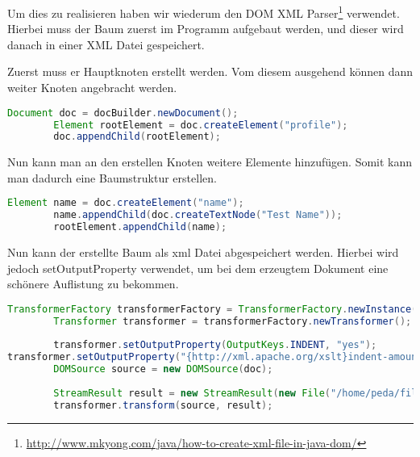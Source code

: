 Um dies zu realisieren haben wir wiederum den DOM XML Parser\footnote{\url{http://www.mkyong.com/java/how-to-create-xml-file-in-java-dom/}} verwendet. Hierbei muss der Baum zuerst im Programm aufgebaut werden, und dieser wird danach in einer XML Datei gespeichert.

Zuerst muss er Hauptknoten erstellt werden. Vom diesem ausgehend können dann weiter Knoten angebracht werden.
\begin{lstlisting}[language=JAVA]
		Document doc = docBuilder.newDocument();
		Element rootElement = doc.createElement("profile");
		doc.appendChild(rootElement);
\end{lstlisting}

Nun kann man an den erstellen Knoten weitere Elemente hinzufügen. Somit kann man dadurch eine Baumstruktur erstellen.
\begin{lstlisting}[language=JAVA]
Element name = doc.createElement("name");
		name.appendChild(doc.createTextNode("Test Name"));
		rootElement.appendChild(name);
\end{lstlisting}

Nun kann der erstellte Baum als xml Datei abgespeichert werden. Hierbei wird jedoch setOutputProperty verwendet, um bei dem erzeugtem Dokument eine schönere Auflistung zu bekommen.
\begin{lstlisting}[language=JAVA]
TransformerFactory transformerFactory = TransformerFactory.newInstance();
		Transformer transformer = transformerFactory.newTransformer();
		
		transformer.setOutputProperty(OutputKeys.INDENT, "yes");
transformer.setOutputProperty("{http://xml.apache.org/xslt}indent-amount", "2");
		DOMSource source = new DOMSource(doc);
		
		StreamResult result = new StreamResult(new File("/home/peda/file.xml"));
		transformer.transform(source, result);
\end{lstlisting}